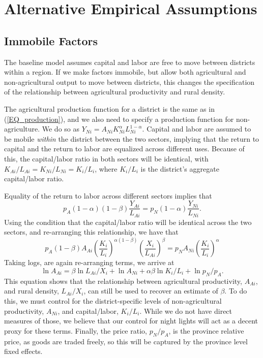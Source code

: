 \documentclass[11pt]{article}
\begin{document}
\section{Alternative Empirical Assumptions}

\subsection{Immobile Factors}
The baseline model assumes capital and labor are free to move between districts within a region. If we make factors immobile, but allow both agricultural and non-agricultural output to move between districts, this changes the specification of the relationship between agricultural productivity and rural density. 

The agricultural production function for a district is the same as in (\ref{EQ_production}), and we also need to specify a production function for non-agriculture. We do so as $Y_{Ni} = A_{Ni} K_{Ni}^{\alpha} L_{Ni}^{1-\alpha}$. Capital and labor are assumed to be mobile \textit{within} the district between the two sectors, implying that the return to capital and the return to labor are equalized across different uses. Because of this, the capital/labor ratio in both sectors will be identical, with $K_{Ai}/L_{Ai} = K_{Ni}/L_{Ni} = K_i/L_i$, where $K_i/L_i$ is the district's aggregate capital/labor ratio. 

Equality of the return to labor across different sectors implies that 
\begin{equation}
	p_A (1-\alpha)(1-\beta)\frac{Y_{Ai}}{L_{Ai}} = p_N (1-\alpha)\frac{Y_{Ni}}{L_{Ni}}. \nonumber
\end{equation}
Using the condition that the capital/labor ratio will be identical across the two sectors, and re-arranging this relationship, we have that
\begin{equation}
    p_A (1-\beta) A_{Ai} \left(\frac{K_i}{L_i}\right)^{\alpha(1-\beta)} \left(\frac{X_i}{L_{Ai}}\right)^{\beta} = p_N A_{Ni} \left(\frac{K_i}{L_i}\right)^{\alpha} \nonumber
\end{equation}
Taking logs, are again re-arranging terms, we arrive at
\begin{equation}
	\ln A_{Ai} = \beta \ln L_{Ai}/X_i + \ln A_{Ni} + \alpha\beta \ln K_i/L_i + \ln p_N/p_A. \nonumber
\end{equation}
This equation shows that the relationship between agricultural productivity, $A_{Ai}$, and rural density, $L_{Ai}/X_i$, can still be used to recover an estimate of $\beta$. To do this, we must control for the district-specific levels of non-agricultural productivity, $A_{Ni}$, and capital/labor, $K_i/L_i$. While we do not have direct measures of those, we believe that our control for night lights will act as a decent proxy for these terms. Finally, the price ratio, $p_N/p_A$, is the province relative price, as goods are traded freely, so this will be captured by the province level fixed effects.
\end{document}
